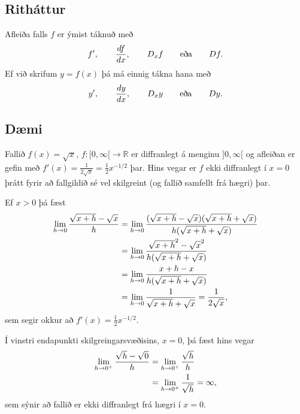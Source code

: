 \documentclass[a4paper,10pt,icelandic]{sphinxmanual}
\begin{document}
\subsection{Ritháttur}
\label{kafli03:rithattur}
Afleiða falls \(f\) er ýmist táknuð með
\begin{gather}
\begin{split}f', \qquad \frac {df}{dx}, \qquad D_x f \qquad \text{eða} \qquad Df.\end{split}\notag
\end{gather}
Ef við skrifum \(y=f(x)\) þá má einnig tákna hana með
\begin{gather}
\begin{split}y', \qquad \frac {dy}{dx}, \qquad D_x y \qquad \text{eða} \qquad Dy.\end{split}\notag
\end{gather}

\subsection{Dæmi}
\label{kafli03:id3}
Fallið \(f(x) = \sqrt{x}\), \(f:[0,\infty[\to {{\mathbb  R}}\)
er diffranlegt á menginu \(]0,\infty[\) og afleiðan er gefin með
\(f'(x) = \frac 1{2\sqrt{x}} = \frac 12 x^{-1/2}\) þar. Hins vegar
er \(f\) ekki diffranlegt í \(x=0\) þrátt fyrir að fallgildið sé
vel skilgreint (og fallið samfellt frá hægri) þar.

Ef \(x>0\) þá fæst
\begin{gather}
\begin{split}\begin{aligned}
  \lim_{h\to 0} \frac{\sqrt{x+h}-\sqrt{x}}h &=
  \lim_{h\to 0} \frac{(\sqrt{x+h}-\sqrt{x})(\sqrt{x+h}+\sqrt{x})}{h(\sqrt{x+h}+\sqrt{x})}\\
  &= \lim_{h\to 0} \frac{\sqrt{x+h}^2-\sqrt{x}^2}{h(\sqrt{x+h}+\sqrt{x})}\\
  &= \lim_{h\to 0} \frac{x+h-x}{h(\sqrt{x+h}+\sqrt{x})}\\
  &= \lim_{h\to 0} \frac{1}{\sqrt{x+h}+\sqrt{x}} = \frac{1}{2\sqrt{x}},\end{aligned}\end{split}\notag
\end{gather}
sem segir okkur að \(f'(x) = \frac 12 x^{-1/2}\).

Í vinstri endapunkti skilgreingarsvæðisins, \(x=0\), þá fæst hins
vegar
\begin{gather}
\begin{split}\begin{aligned}
  \lim_{h\to 0^+} \frac{\sqrt{h}-\sqrt{0}}h &=
  \lim_{h\to 0^+} \frac{\sqrt{h}}h\\
  &= \lim_{h\to 0^+} \frac{1}{\sqrt{h}} = \infty,\end{aligned}\end{split}\notag
\end{gather}
sem sýnir að fallið er ekki diffranlegt frá hægri í \(x=0\).
\end{document}
